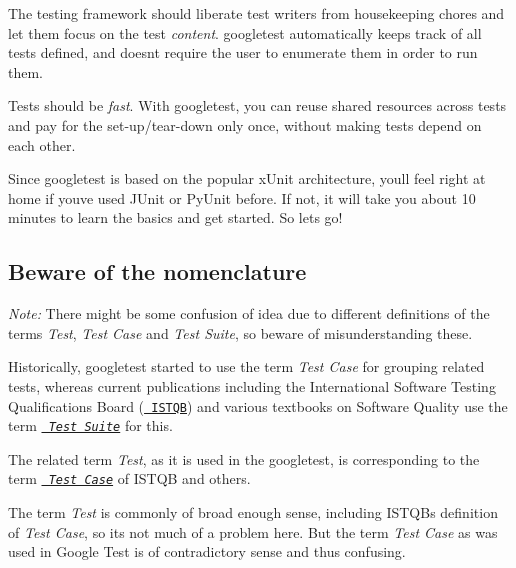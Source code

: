 \begin{DoxyEnumerate}
\item The testing framework should liberate test writers from housekeeping chores and let them focus on the test {\itshape content}. googletest automatically keeps track of all tests defined, and doesn\textquotesingle{}t require the user to enumerate them in order to run them.
\end{DoxyEnumerate}
\begin{DoxyEnumerate}
\item Tests should be {\itshape fast}. With googletest, you can reuse shared resources across tests and pay for the set-\/up/tear-\/down only once, without making tests depend on each other.
\end{DoxyEnumerate}

Since googletest is based on the popular x\+Unit architecture, you\textquotesingle{}ll feel right at home if you\textquotesingle{}ve used J\+Unit or Py\+Unit before. If not, it will take you about 10 minutes to learn the basics and get started. So let\textquotesingle{}s go!

\subsection*{Beware of the nomenclature}

{\itshape Note\+:} There might be some confusion of idea due to different definitions of the terms {\itshape Test}, {\itshape Test Case} and {\itshape Test Suite}, so beware of misunderstanding these.

Historically, googletest started to use the term {\itshape Test Case} for grouping related tests, whereas current publications including the International Software Testing Qualifications Board (\href{http://www.istqb.org/}{\texttt{ I\+S\+T\+QB}}) and various textbooks on Software Quality use the term {\itshape \href{http://glossary.istqb.org/search/test%20suite}{\texttt{ Test Suite}}} for this.

The related term {\itshape Test}, as it is used in the googletest, is corresponding to the term {\itshape \href{http://glossary.istqb.org/search/test%20case}{\texttt{ Test Case}}} of I\+S\+T\+QB and others.

The term {\itshape Test} is commonly of broad enough sense, including I\+S\+T\+QB\textquotesingle{}s definition of {\itshape Test Case}, so it\textquotesingle{}s not much of a problem here. But the term {\itshape Test Case} as was used in Google Test is of contradictory sense and thus confusing.

